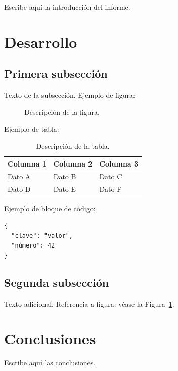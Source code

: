 \documentclass[11pt, a4paper]{article}
\begin{document}
Escribe aquí la introducción del informe.

\section{Desarrollo}

\subsection{Primera subsección}

Texto de la subsección. Ejemplo de figura:

\begin{figure}[H]
    \centering
    \caption{Descripción de la figura.}
    \label{fig:ejemplo}
\end{figure}

Ejemplo de tabla:

\begin{table}[H]
    \centering
    \renewcommand{\arraystretch}{1.5}
    \small
    \begin{tabular}{|p{4cm}|p{4cm}|p{4cm}|}
    \hline
    \textbf{Columna 1} & \textbf{Columna 2} & \textbf{Columna 3} \\
    \hline
    Dato A & Dato B & Dato C \\
    \hline
    Dato D & Dato E & Dato F \\
    \hline
    \end{tabular}
    \caption{Descripción de la tabla.}
    \label{tab:ejemplo}
\end{table}

Ejemplo de bloque de código:

\begin{lstlisting}
{
  "clave": "valor",
  "número": 42
}
\end{lstlisting}

\subsection{Segunda subsección}

Texto adicional. Referencia a figura: véase la Figura~\ref{fig:ejemplo}.

\section{Conclusiones}

Escribe aquí las conclusiones.

%
\end{document}
